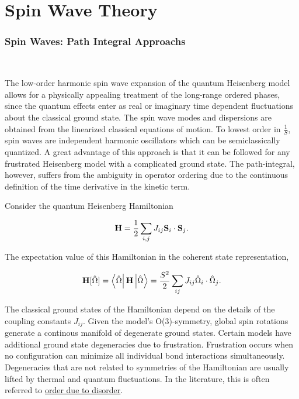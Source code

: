\documentclass{homework}
\begin{document}
\clearpage

\section{\textbf{Spin Wave Theory}}

\subsubsection{Spin Waves: Path Integral Approachs}

\blanky \\

\begin{tcolorbox}[colback = yellow, title = Physical Context]

The low-order harmonic spin wave expansion of the quantum Heisenberg model allows for a physically appealing treatment of the long-range ordered phases, since the quantum effects enter as real or imaginary time dependent fluctuations about the classical ground state. The spin wave modes and dispersions are obtained from the linearized classical equations of motion. To lowest order in $\frac{1}{S}$, spin waves are independent harmonic oscillators which can be semiclassically quantized. A great advantage of this approach is that it can be followed for any frustrated Heisenberg model with a complicated ground state. The path-integral, however, suffers from the ambiguity in operator ordering due to the continuous definition of the time derivative in the kinetic term. 

\end{tcolorbox}

Consider the quantum Heisenberg Hamiltonian 

$$
    {\bf H} = \frac{1}{2} \sum_{i,j} J_{ij} {\bf S}_i \cdot {\bf S}_j. 
$$

The expectation value of this Hamiltonian in the coherent state representation, 

\begin{equation}
    {\bf H}[\hat{\Omega}] = \bra{\hat{\Omega}} {{\bf H}} \ket{\hat{\Omega}} = \frac{S^2}{2} \sum_{ij} J_{ij} \hat{\Omega}_i \cdot \hat{\Omega}_j.
\end{equation}

The classical ground states of the Hamiltonian depend on the details of the coupling constants $J_{ij}$. Given the model's O(3)-symmetry, global spin rotations generate a continous manifold of degenerate ground states. Certain models have additional ground state degeneracies due to frustration. Frustration occurs when no configuration can minimize all individual bond interactions simultaneously. Degeneracies that are not related to symmetries of the Hamiltonian are usually lifted by thermal and quantum fluctuations. In the literature, this is often referred to \underline{order due to disorder}. \\
\end{document}
